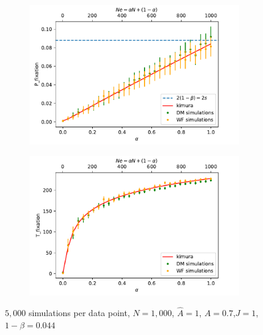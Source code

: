 \documentclass[11pt]{article}
\begin{document}
\begin{figure}[t]
  \begin{center}
  \begin{subfigure}[a]{0.49\linewidth}
    \includegraphics[width=\linewidth]{../figures/binary/fix_prob_var_alpha.pdf}
   \end{subfigure}
   \begin{subfigure}[a]{0.49\linewidth}
    \includegraphics[width=\linewidth]{../figures/binary/fix_time_var_alpha.pdf}
   \end{subfigure}
  \end{center}
  \caption{$5,000$ simulations per data point, $N=1,000$, $\hat{A}=1$, $A=0.7$,$J=1$,$1-\beta=0.044$}
  \label{fig:var_alpha}
\end{figure}
\end{document}
